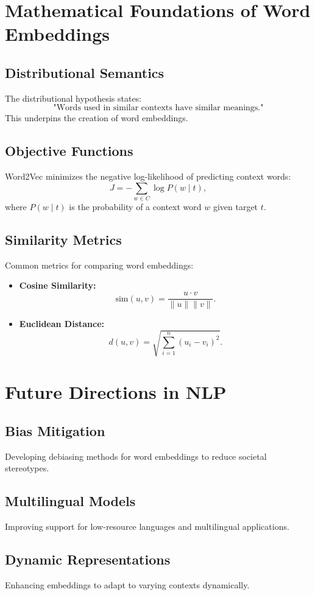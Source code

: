 \section{Mathematical Foundations of Word Embeddings}
\subsection{Distributional Semantics}
The distributional hypothesis states:
\[
\text{"Words used in similar contexts have similar meanings."}
\]
This underpins the creation of word embeddings.

\subsection{Objective Functions}
Word2Vec minimizes the negative log-likelihood of predicting context words:
\[
J = -\sum_{w \in C} \log P(w \mid t),
\]
where \(P(w \mid t)\) is the probability of a context word \(w\) given target \(t\).

\subsection{Similarity Metrics}
Common metrics for comparing word embeddings:
\begin{itemize}
    \item \textbf{Cosine Similarity:}
    \[
    \text{sim}(u, v) = \frac{u \cdot v}{\|u\| \|v\|}.
    \]
    \item \textbf{Euclidean Distance:}
    \[
    d(u, v) = \sqrt{\sum_{i=1}^n (u_i - v_i)^2}.
    \]
\end{itemize}

\section{Future Directions in NLP}
\subsection{Bias Mitigation}
Developing debiasing methods for word embeddings to reduce societal stereotypes.

\subsection{Multilingual Models}
Improving support for low-resource languages and multilingual applications.

\subsection{Dynamic Representations}
Enhancing embeddings to adapt to varying contexts dynamically.


